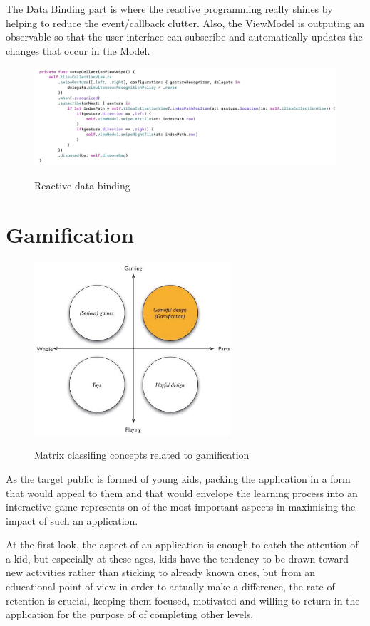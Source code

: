 \documentclass[12 pct]{report}
\begin{document}
The Data Binding part is where the reactive programming really shines by helping to reduce the event/callback clutter. Also, the ViewModel is outputing an observable so that the user interface can subscribe and automatically updates the changes that occur in the Model.


\begin{figure}[H]
\includegraphics[width=1.0\textwidth]{reactive-ui}
\centering
\label{fig:reactive-repository}
\caption{ Reactive data binding }
\end{figure}

\section{Gamification}
\begin{figure}[H]
\includegraphics[width=0.65\textwidth]{gamification}
\centering
\label{fig:feature-points}
\caption{ Matrix classifing concepts related to gamification \cite{deterding} }
\end{figure}

As the target public is formed of young kids, packing the application in a form that would appeal to them and that would envelope the learning process into an interactive game represents on of the most important aspects in maximising the impact of such an application. 

At the first look, the aspect of an application is enough to catch the attention of a kid, but especially at these ages, kids have the tendency to be drawn toward new activities rather than sticking to already known ones, but from an educational point of view in order to actually make a difference, the rate of retention is crucial, keeping them focused, motivated and willing to return in the application for the purpose of of completing other levels.
\end{document}
